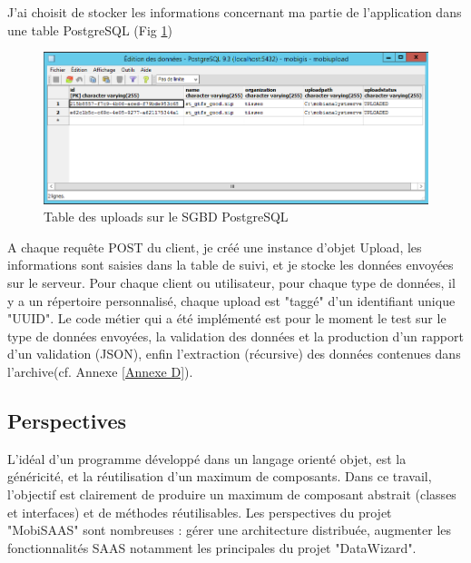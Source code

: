 \begin{itemize}
J'ai choisit de stocker les informations concernant ma partie de l'application dans une table PostgreSQL (Fig \ref{TablePostgres})\\
\begin{figure}[!h]
\centering
\includegraphics[width=14cm]{images/tablePostgres_mobiupload_small.png}
\caption{\label{TablePostgres}Table des uploads sur le SGBD PostgreSQL}
\end{figure} 

A chaque requête POST du client, je créé une instance d'objet Upload, les informations sont saisies dans la table de suivi, et je stocke les données envoyées sur le serveur. Pour chaque client ou utilisateur, pour chaque type de données, il y a un répertoire personnalisé, chaque upload est "taggé" d'un identifiant unique "UUID".
Le code métier qui a été implémenté est pour le moment le test sur le type de données envoyées, la validation des données et la production d'un rapport d'un validation (JSON), enfin l'extraction (récursive) des données contenues dans l'archive(cf. Annexe \ref{Annexe D}).\\

\subsection{Perspectives}

L'idéal d'un programme développé dans un langage orienté objet, est la généricité, et la réutilisation d'un maximum de composants. Dans ce travail, l'objectif est clairement de produire un maximum de composant abstrait (classes et interfaces) et de méthodes réutilisables. Les perspectives du projet "MobiSAAS" sont nombreuses : gérer une architecture distribuée, augmenter les fonctionnalités SAAS notamment les principales du projet "DataWizard".\\


\end{itemize}
